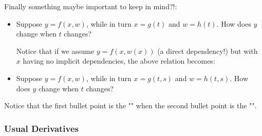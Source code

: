 	Finally something maybe important to keep in mind?!:
	\begin{itemize}
		\item Suppose $y=f(x,w)$, while in turn $x=g(t)$ and $w=h(t)$. How does $y$ change when $t$ changes?
		
		Notice that if we assume $y=f(x,w(x))$ (a direct dependency!) but with $x$ having no implicit dependencies, the above relation  becomes\label{tota differential with direct dependency}:
		
		
		\item Suppose $y=f(x,w)$, while in turn $x=g(t,s)$ and $w=h(t,s)$. How does $y$ change when $t$ changes?
		
	\end{itemize}
	Notice that the first bullet point is the "" when the second bullet point is the "".
	 
	 \subsubsection{Usual Derivatives}\label{usual derivatives}
	 
